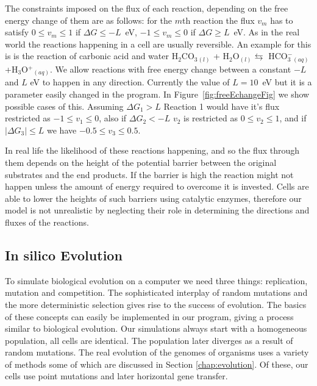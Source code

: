 \documentclass[a4paper,12pt]{article}
\begin{document}
	The constraints imposed on the flux of each reaction, depending on the free energy change of them are as follows: for the $m$th reaction the flux $v_m$ has to satisfy $0\leq v_m \leq 1 $ if $\Delta G \leq -L$~eV, $-1\leq v_m \leq 0 $ if $\Delta G \geq L$~eV. As in the real world the reactions happening in a cell are usually reversible.  An example for this is is the reaction of carbonic acid and water H$_2$CO$_3$$_{(l)}$ + H$_2$O$_{(l)} \leftrightarrows$ HCO$^-_3$$_{(aq)}$+H$_3$O$^+$$_{(aq)}$. We allow reactions with free energy change between a constant $-L$ and $L$ eV to happen in any direction. Currently the value of $L=10$~eV but it is a parameter easily changed in the program. In Figure~\ref{fig:freeEchangeFig} we show possible cases of this. Assuming $\Delta G_1 > L$ Reaction 1 would have it's flux restricted as $-1\leq v_1 \leq 0$, also if $\Delta G_2 < -L$ $v_2$ is restricted as $0 \leq v_2 \leq 1$, and if $|\Delta G_3 | \leq L$ we have $-0.5 \leq v_3 \leq 0.5$. 

	In real life the likelihood of these reactions happening, and so the flux through them depends on the height of the potential barrier between the original substrates and the end products. If the barrier is high the reaction might not happen unless the amount of energy required to overcome it is invested. Cells are able to lower the heights of such barriers using catalytic enzymes, therefore our model is not unrealistic by neglecting their role in determining the directions and fluxes of the reactions. 

\subsection{In silico Evolution}
\label{sub:implementing evolution}
To simulate biological evolution on a computer we need three things: replication, mutation and competition. The sophisticated interplay of random mutations and the more deterministic selection gives rise to the success of evolution. The basics of these concepts can easily be implemented in our program, giving a process similar to biological evolution. Our simulations always start with a homogeneous population, all cells are identical. The population later diverges as a result of random mutations. The real evolution of the genomes of organisms uses a variety of methods some of which are discussed in Section \ref{chap:evolution}. Of these, our cells use point mutations and later horizontal gene transfer.
	
\end{document}

